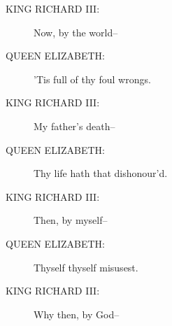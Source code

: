 \documentclass{article}
\begin{document}
\begin{description}
\item[KING RICHARD III:] 
\hspace{1pt}Now, by the world--\\
\end{description}
\begin{description}
\item[QUEEN ELIZABETH:] 
\hspace{1pt}'Tis full of thy foul wrongs.\\
\end{description}
\begin{description}
\item[KING RICHARD III:] 
\hspace{1pt}My father's death--\\
\end{description}
\begin{description}
\item[QUEEN ELIZABETH:] 
\hspace{1pt}Thy life hath that dishonour'd.\\
\end{description}
\begin{description}
\item[KING RICHARD III:] 
\hspace{1pt}Then, by myself--\\
\end{description}
\begin{description}
\item[QUEEN ELIZABETH:] 
\hspace{1pt}Thyself thyself misusest.\\
\end{description}
\begin{description}
\item[KING RICHARD III:] 
\hspace{1pt}Why then, by God--\\
\end{description}
\end{document}
